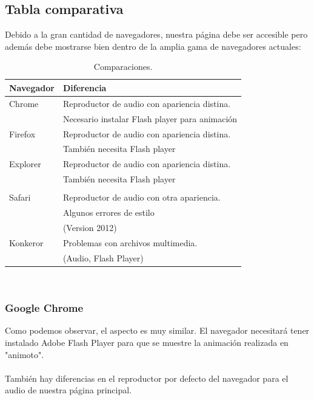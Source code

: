 \subsection{Tabla comparativa}
Debido a la gran cantidad de navegadores, nuestra página debe ser accesible pero además debe mostrarse bien dentro de la amplia gama de navegadores actuales:\\
\begin{table}[htbp]
	\begin{center}
		\begin{tabular}{|l|l|}
			\hline
			Navegador & Diferencia \\
			\hline \hline
			Chrome & Reproductor de audio con apariencia distina. \\ & Necesario instalar Flash player para animación \\ \hline
			Firefox & Reproductor de audio con apariencia distina. \\ & También necesita Flash player \\ \hline
			Explorer & Reproductor de audio con apariencia distina. \\ & También necesita Flash player \\ \\ \hline
			Safari & Reproductor de audio con otra apariencia.  \\ & Algunos errores de estilo \\ &(Version 2012) \\ \hline
			Konkeror & Problemas con archivos multimedia. \\
			& (Audio, Flash Player) \\ \hline
		\end{tabular}
		\caption{Comparaciones.}
		\label{tabla:sencilla}
	\end{center}
\end{table}\\
\subsubsection{Google Chrome}
Como podemos observar, el aspecto es muy similar. El navegador necesitará tener instalado Adobe Flash Player para que se muestre la animación realizada en "animoto". \\ \\ También hay diferencias en el reproductor por defecto del navegador para el audio de nuestra página principal.

